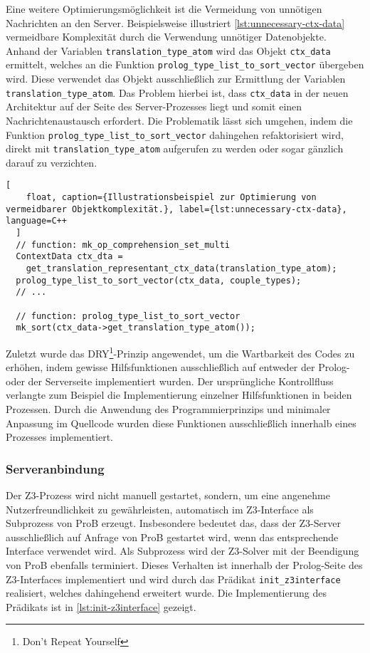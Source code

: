 Eine weitere Optimierungsmöglichkeit ist die Vermeidung von unnötigen Nachrichten an den Server.
Beispielsweise illustriert \cref{lst:unnecessary-ctx-data} vermeidbare Komplexität durch die Verwendung unnötiger Datenobjekte.
Anhand der Variablen \texttt{translation\_type\_atom} wird das Objekt \texttt{ctx\_data} ermittelt, welches an die Funktion \texttt{prolog\_type\_list\_to\_sort\_vector} übergeben wird.
Diese verwendet das Objekt ausschließlich zur Ermittlung der Variablen \texttt{translation\_type\_atom}. Das Problem hierbei ist,
dass \texttt{ctx\_data} in der neuen Architektur auf der Seite des Server-Prozesses liegt und somit einen Nachrichtenaustausch erfordert.
Die Problematik lässt sich umgehen, indem die Funktion \texttt{prolog\_type\_list\_to\_sort\_vector} dahingehen refaktorisiert wird,
direkt mit \texttt{translation\_type\_atom} aufgerufen zu werden oder sogar gänzlich darauf zu verzichten.

\begin{lstlisting}[
    float, caption={Illustrationsbeispiel zur Optimierung von vermeidbarer Objektkomplexität.}, label={lst:unnecessary-ctx-data}, language=C++
  ]
  // function: mk_op_comprehension_set_multi
  ContextData ctx_dta =
    get_translation_representant_ctx_data(translation_type_atom);
  prolog_type_list_to_sort_vector(ctx_data, couple_types);
  // ...

  // function: prolog_type_list_to_sort_vector
  mk_sort(ctx_data->get_translation_type_atom());
\end{lstlisting}

Zuletzt wurde das DRY\footnote{Don't Repeat Yourself}-Prinzip angewendet, um die Wartbarkeit des Codes zu erhöhen,
indem gewisse Hilfsfunktionen ausschließlich auf entweder der Prolog- oder der Serverseite implementiert wurden.
Der ursprüngliche Kontrollfluss verlangte zum Beispiel die Implementierung einzelner Hilfsfunktionen
in beiden Prozessen. Durch die Anwendung des Programmierprinzips und minimaler Anpassung im Quellcode wurden diese Funktionen ausschließlich innerhalb eines Prozesses implementiert.

\subsubsection{Serveranbindung}
\label{subsec:server-connection}

Der Z3-Prozess wird nicht manuell gestartet, sondern,
um eine angenehme Nutzerfreundlichkeit zu gewährleisten, automatisch im Z3-Interface als Subprozess von ProB erzeugt.
Insbesondere bedeutet das, dass der Z3-Server ausschließlich auf Anfrage von ProB gestartet wird, wenn das entsprechende Interface verwendet wird.
Als Subprozess wird der Z3-Solver mit der Beendigung von ProB ebenfalls terminiert.
Dieses Verhalten ist innerhalb der Prolog-Seite des Z3-Interfaces implementiert und wird durch das Prädikat \texttt{init\_z3interface} realisiert, welches dahingehend erweitert wurde.
Die Implementierung des Prädikats ist in \cref{lst:init-z3interface} gezeigt.

